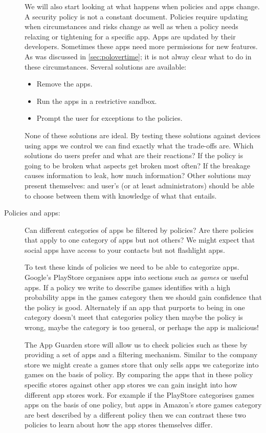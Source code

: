 \documentclass[a4paper,sfsidenotes]{%
  article%
}
\begin{document}
\begin{description}
    We will also start looking at what happens when policies and apps change.  A security
    policy is not a constant document.  Policies require updating when
    circumstances and risks change as well as when a policy needs relaxing or
    tightening for a specific app. Apps are updated by their developers.
    Sometimes these apps need more permissions for new features.  As was discussed in
    \autoref{sec:polovertime}; it is not alway clear what to do in these
    circumstances. Several solutions are available:

    \begin{itemize}
      \item Remove the apps.
      \item Run the apps in a restrictive sandbox.
      \item Prompt the user for exceptions to the policies.
    \end{itemize}

    None of these solutions are ideal. By testing these solutions against
    devices using apps we control we can find exactly what the trade-offs are.
    Which solutions do users prefer and what are their reactions?  If the policy
    is going to be broken what aspects get broken most often?  If the breakage
    causes information to leak, how much information?  Other solutions may
    present themselves: and user's (or at least administrators) should be able
    to choose between them with knowledge of what that entails.
    
  \item[Policies and apps:] Can different categories of apps be filtered by
    policies?  Are there policies that apply to one category of apps but not
    others?  We might expect that social apps have access to your contacts but
    not flashlight apps.
  
    To test these kinds of policies we need to be able to categorize apps.
    Google's PlayStore organises apps into sections such as \emph{games} or
    useful apps.  If a policy we write to describe games identifies with a high
    probability apps in the games category then we should gain confidence that
    the policy is good.  Alternately if an app that purports to being in one
    category doesn't meet that categories policy then maybe the policy is wrong,
    maybe the category is too general, or perhaps the app is malicious!

    The App Guarden store will allow us to check policies such as these by
    providing a set of apps and a filtering mechanism.  Similar to the company
    store we might create a games store that only sells apps we categorize into
    games on the basis of policy.  By comparing the apps that in these policy
    specific stores against other app stores we can gain insight into how
    different app stores work.  For example if the PlayStore categorises games
    apps on the basis of one policy, but apps in Amazon's store games category
    are best described by a different policy then we can contrast these two
    policies to learn about how the app stores themselves differ.


\end{description}
\end{document}
